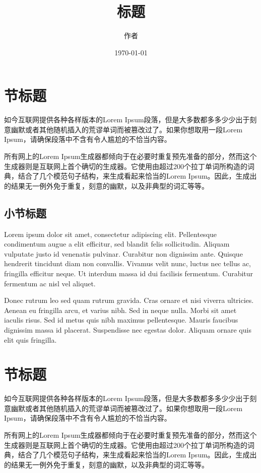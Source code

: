 \documentclass[UTF8]{ctexart}  %
\begin{document}
\title{标题}
\author{作者}
\date{\today}
\maketitle

\section{节标题}

如今互联网提供各种各样版本的Lorem Ipsum段落，但是大多数都多多少少出于刻意幽默或者其他随机插入的荒谬单词而被篡改过了。如果你想取用一段Lorem Ipsum，请确保段落中不含有令人尴尬的不恰当内容。

所有网上的Lorem Ipsum生成器都倾向于在必要时重复预先准备的部分，然而这个生成器则是互联网上首个确切的生成器。它使用由超过200个拉丁单词所构造的词典，结合了几个模范句子结构，来生成看起来恰当的Lorem Ipsum。因此，生成出的结果无一例外免于重复，刻意的幽默，以及非典型的词汇等等。

\subsection{小节标题}

Lorem ipsum dolor sit amet, consectetur adipiscing elit. Pellentesque condimentum augue a elit efficitur, sed blandit felis sollicitudin. Aliquam vulputate justo id venenatis pulvinar. Curabitur non dignissim ante. Quisque hendrerit tincidunt diam non convallis. Vivamus velit nunc, luctus nec tellus ac, fringilla efficitur neque. Ut interdum massa id dui facilisis fermentum. Curabitur fermentum ac nisl vel aliquet.

Donec rutrum leo sed quam rutrum gravida. Cras ornare et nisi viverra ultricies. Aenean eu fringilla arcu, et varius nibh. Sed in neque nulla. Morbi sit amet iaculis risus. Sed id metus quis nibh maximus pellentesque. Mauris faucibus dignissim massa id placerat. Suspendisse nec egestas dolor. Aliquam ornare quis elit quis fringilla.

\section{节标题}

如今互联网提供各种各样版本的Lorem Ipsum段落，但是大多数都多多少少出于刻意幽默或者其他随机插入的荒谬单词而被篡改过了。如果你想取用一段Lorem Ipsum，请确保段落中不含有令人尴尬的不恰当内容。

所有网上的Lorem Ipsum生成器都倾向于在必要时重复预先准备的部分，然而这个生成器则是互联网上首个确切的生成器。它使用由超过200个拉丁单词所构造的词典，结合了几个模范句子结构，来生成看起来恰当的Lorem Ipsum。因此，生成出的结果无一例外免于重复，刻意的幽默，以及非典型的词汇等等。
\end{document}
